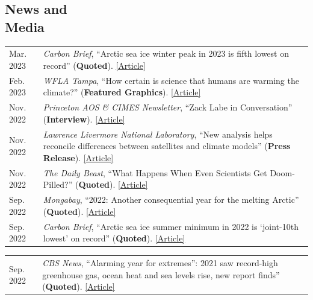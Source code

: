 \documentclass[margin,line,palatino,courier,10pt]{res}
\begin{document}
\begin{resume}
\section{\sc \textcolor{Cerulean}{\large{\textbf{News and\\ Media}}}}
\vspace*{0.04in}
\begin{tabular}{@{}p{0.9in}p{4in}}
Mar. 2023 & \textit{Carbon Brief}, ``Arctic sea ice winter peak in 2023 is fifth lowest on record'' (\textbf{Quoted}). \href{https://www.carbonbrief.org/arctic-sea-ice-winter-peak-in-2023-is-fifth-lowest-on-record/}{[Article]}\\
Feb. 2023 & \textit{WFLA Tampa}, ``How certain is science that humans are warming the climate?'' (\textbf{Featured Graphics}). \href{https://www.wfla.com/weather/climate-classroom/how-certain-is-science-that-humans-are-warming-the-climate/}{[Article]}\\
Nov. 2022 & \textit{Princeton AOS \& CIMES Newsletter}, ``Zack Labe in Conversation'' (\textbf{Interview}). \href{https://aos.princeton.edu/sites/g/files/toruqf1176/files/documents/AOS\%20\%26\%20CIMES\%20Newsletter\%20Fall\%202022.pdf}{[Article]}\\
Nov. 2022 & \textit{Lawrence Livermore National Laboratory}, ``New analysis helps reconcile differences between satellites and climate models'' (\textbf{Press Release}). \href{https://www.llnl.gov/news/new-analysis-helps-reconcile-differences-between-satellites-climate-models}{[Article]}\\
Nov. 2022 & \textit{The Daily Beast}, ``What Happens When Even Scientists Get Doom-Pilled?'' (\textbf{Quoted}). \href{https://www.thedailybeast.com/how-climate-change-doomerism-is-even-taking-over-scientists}{[Article]}\\
Sep. 2022 & \textit{Mongabay}, ``2022: Another consequential year for the melting Arctic'' (\textbf{Quoted}). \href{https://news.mongabay.com/2022/09/2022-another-consequential-year-for-the-melting-arctic/}{[Article]}\\
Sep. 2022 & \textit{Carbon Brief}, ``Arctic sea ice summer minimum in 2022 is `joint-10th lowest' on record'' (\textbf{Quoted}). \href{https://www.carbonbrief.org/arctic-sea-ice-summer-minimum-in-2022-is-joint-10th-lowest-on-record/}{[Article]}\\
\end{tabular}
\begin{tabular}{@{}p{0.9in}p{4in}}
Sep. 2022 & \textit{CBS News}, ``Alarming year for extremes'': 2021 saw record-high greenhouse gas, ocean heat and sea levels rise, new report finds'' (\textbf{Quoted}). \href{https://www.cbsnews.com/news/2021-record-high-greenhouse-gases-ocean-heat-and-sea-level-rise-extreme-heat/}{[Article]}\\

\end{tabular}
\end{resume}
\end{document}
